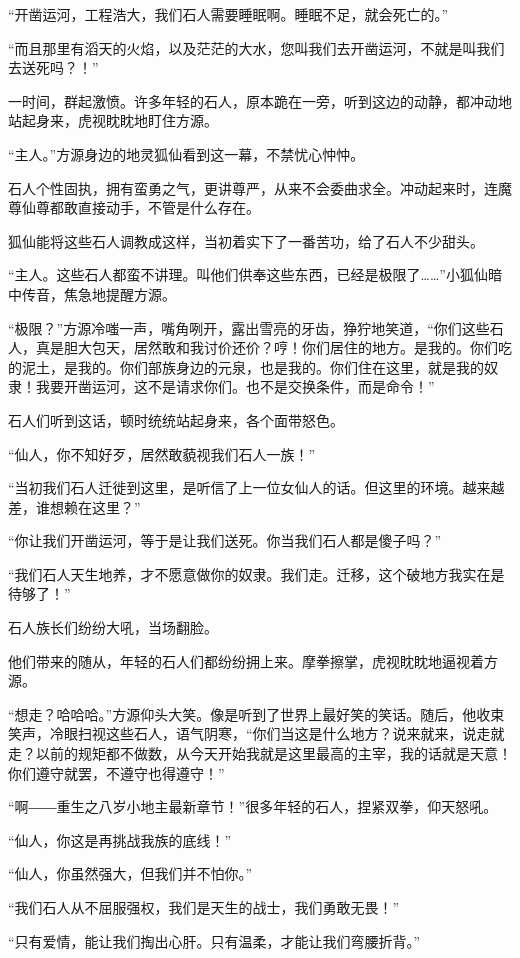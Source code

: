 \begin{this_body}
“开凿运河，工程浩大，我们石人需要睡眠啊。睡眠不足，就会死亡的。”

“而且那里有滔天的火焰，以及茫茫的大水，您叫我们去开凿运河，不就是叫我们去送死吗？！”

一时间，群起激愤。许多年轻的石人，原本跪在一旁，听到这边的动静，都冲动地站起身来，虎视眈眈地盯住方源。

“主人。”方源身边的地灵狐仙看到这一幕，不禁忧心忡忡。

石人个性固执，拥有蛮勇之气，更讲尊严，从来不会委曲求全。冲动起来时，连魔尊仙尊都敢直接动手，不管是什么存在。

狐仙能将这些石人调教成这样，当初着实下了一番苦功，给了石人不少甜头。

“主人。这些石人都蛮不讲理。叫他们供奉这些东西，已经是极限了……”小狐仙暗中传音，焦急地提醒方源。

“极限？”方源冷嗤一声，嘴角咧开，露出雪亮的牙齿，狰狞地笑道，“你们这些石人，真是胆大包天，居然敢和我讨价还价？哼！你们居住的地方。是我的。你们吃的泥土，是我的。你们部族身边的元泉，也是我的。你们住在这里，就是我的奴隶！我要开凿运河，这不是请求你们。也不是交换条件，而是命令！”

石人们听到这话，顿时统统站起身来，各个面带怒色。

“仙人，你不知好歹，居然敢藐视我们石人一族！”

“当初我们石人迁徙到这里，是听信了上一位女仙人的话。但这里的环境。越来越差，谁想赖在这里？”

“你让我们开凿运河，等于是让我们送死。你当我们石人都是傻子吗？”

“我们石人天生地养，才不愿意做你的奴隶。我们走。迁移，这个破地方我实在是待够了！”

石人族长们纷纷大吼，当场翻脸。

他们带来的随从，年轻的石人们都纷纷拥上来。摩拳擦掌，虎视眈眈地逼视着方源。

“想走？哈哈哈。”方源仰头大笑。像是听到了世界上最好笑的笑话。随后，他收束笑声，冷眼扫视这些石人，语气阴寒，“你们当这是什么地方？说来就来，说走就走？以前的规矩都不做数，从今天开始我就是这里最高的主宰，我的话就是天意！你们遵守就罢，不遵守也得遵守！”

“啊――重生之八岁小地主最新章节！”很多年轻的石人，捏紧双拳，仰天怒吼。

“仙人，你这是再挑战我族的底线！”

“仙人，你虽然强大，但我们并不怕你。”

“我们石人从不屈服强权，我们是天生的战士，我们勇敢无畏！”

“只有爱情，能让我们掏出心肝。只有温柔，才能让我们弯腰折背。”


\end{this_body}
